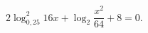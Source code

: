 \begin{ex}[type=equation]
	\begin{condition}
		$2\log_{0,25}^2 16x +\log_2 {\dfrac{x^2}{64}} + 8 = 0.$
	\end{condition}
\end{ex}